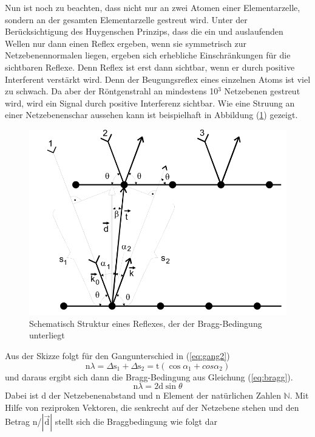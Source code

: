 Nun ist noch zu beachten, dass nicht nur an zwei Atomen einer Elementarzelle, sondern an der gesamten Elementarzelle gestreut wird. 
Unter der Berücksichtigung des Huygenschen Prinzips, dass die ein und auslaufenden Wellen nur dann einen Reflex ergeben, wenn sie symmetrisch zur Netzebenennormalen liegen, ergeben sich erhebliche Einschränkungen für die sichtbaren Reflexe.
Denn Reflex ist erst dann sichtbar, wenn er durch positive Interferent verstärkt wird. Denn der Beugungsreflex eines einzelnen Atoms ist viel zu schwach.
Da aber der Röntgenstrahl an mindestens 10$^3$ Netzebenen gestreut wird, wird ein Signal durch positive Interferenz sichtbar.
Wie eine Struung an einer Netzebenenschar aussehen kann ist beispielhaft in Abbildung (\ref{fig:bragg}) gezeigt.
\begin{figure}[h]
	\centering
	\includegraphics[width = \textwidth]{Abbildungen/bragg}
	\caption{Schematisch Struktur eines Reflexes, der der Bragg-Bedingung unterliegt}
	\label{fig:bragg}
\end{figure}
Aus der Skizze folgt für den Gangunterschied in (\ref{eq:gang2}) 
\begin{equation}
\text{n} \lambda = \Delta \text{s}_1+\Delta \text{s}_2 = \text{t}(\cos{\alpha_1}+cos{\alpha_2})
\label{eq:gang2}
\end{equation}
und daraus ergibt sich dann die Bragg-Bedingung aus Gleichung (\ref{eq:bragg}).
\begin{equation}
\text{n}\lambda = 2 \text{d} \sin{\theta}
\label{eq:bragg}
\end{equation}
Dabei ist d der Netzebenenabstand und n Element der natürlichen Zahlen $\mathbb{N}$.
Mit Hilfe von reziproken Vektoren, die senkrecht auf der Netzebene stehen und den Betrag n/$|\vec{\text{d}}|$ stellt sich die Braggbedingung wie folgt dar
